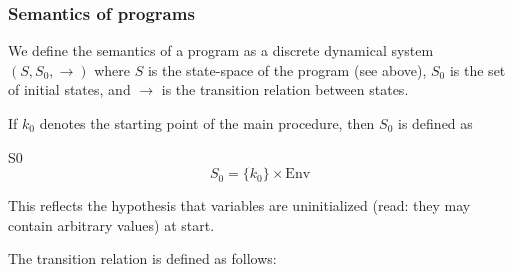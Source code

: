 \documentclass[a4paper,11pt]{article}
\begin{document}
\subsubsection{Semantics of programs}

We define the semantics of a program as a discrete dynamical
system $(S,S_0,\rightarrow)$ where $S$ is the state-space of the
program (see above), $S_0$ is the set of initial states, and
$\rightarrow$ is the transition relation between states.

If $k_0$ denotes the starting point of the main procedure, then $S_0$ is defined as
\htmlonly{\begin{quote}}\begin{image}{S0}
  $$
    S_0=\{k_0\} \times \mathrm{Env}
  $$
 \end{image}\htmlonly{\end{quote}}
This reflects the hypothesis that variables are uninitialized
(read: they may contain arbitrary values) at start.

The transition relation is defined as follows:
\end{document}
